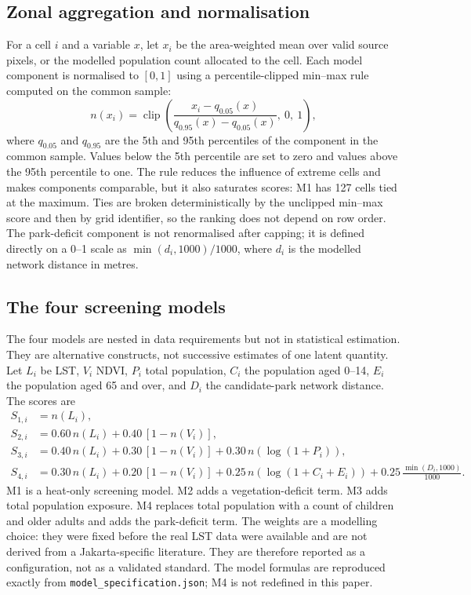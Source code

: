 \documentclass[times,twoside]{_Templates/MultiTargetManuscript}
\begin{document}


\subsection{Zonal aggregation and normalisation}

For a cell $i$ and a variable $x$, let $x_i$ be the area-weighted mean over valid
source pixels, or the modelled population count allocated to the cell. Each
model component is normalised to $[0,1]$ using a percentile-clipped min--max
rule computed on the common sample:
\begin{equation}
n(x_i) = \operatorname{clip}\!\left(
\frac{x_i - q_{0.05}(x)}{q_{0.95}(x) - q_{0.05}(x)},\ 0,\ 1
\right),
\label{eq:norm}
\end{equation}
where $q_{0.05}$ and $q_{0.95}$ are the 5th and 95th percentiles of the
component in the common sample. Values below the 5th percentile are set to zero
and values above the 95th percentile to one. The rule reduces the influence of
extreme cells and makes components comparable, but it also saturates scores:
M1 has 127 cells tied at the maximum. Ties are broken deterministically by the
unclipped min--max score and then by grid identifier, so the ranking does not
depend on row order. The park-deficit component is not renormalised after
capping; it is defined directly on a 0--1 scale as
$\min(d_i,1000)/1000$, where $d_i$ is the modelled network distance in metres.

\subsection{The four screening models}

The four models are nested in data requirements but not in statistical
estimation. They are alternative constructs, not successive estimates of one
latent quantity. Let $L_i$ be LST, $V_i$ NDVI, $P_i$ total population,
$C_i$ the population aged 0--14, $E_i$ the population aged 65 and over, and
$D_i$ the candidate-park network distance. The scores are
\begin{align}
S_{1,i} &= n(L_i), \label{eq:m1}\\
S_{2,i} &= 0.60\,n(L_i) + 0.40\,[1-n(V_i)], \label{eq:m2}\\
S_{3,i} &= 0.40\,n(L_i) + 0.30\,[1-n(V_i)]
          + 0.30\,n(\log(1+P_i)), \label{eq:m3}\\
S_{4,i} &= 0.30\,n(L_i) + 0.20\,[1-n(V_i)]
          + 0.25\,n(\log(1+C_i+E_i))
          + 0.25\,\frac{\min(D_i,1000)}{1000}. \label{eq:m4}
\end{align}
M1 is a heat-only screening model. M2 adds a vegetation-deficit term. M3 adds
total population exposure. M4 replaces total population with a count of children
and older adults and adds the park-deficit term. The weights are a modelling
choice: they were fixed before the real LST data were available and are not
derived from a Jakarta-specific literature. They are therefore reported as a
configuration, not as a validated standard. The model formulas are reproduced
exactly from \texttt{model\_specification.json}; M4 is not redefined in this
paper.
\end{document}
